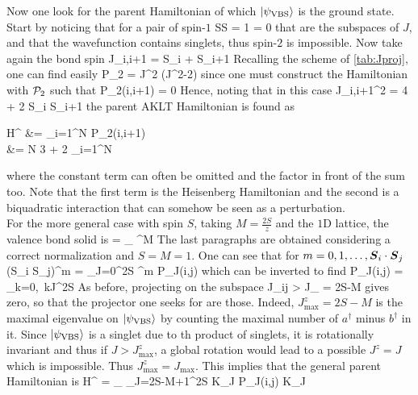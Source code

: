 		Now one look for the parent Hamiltonian of which $\ket{\psi_\text{VBS}}$ is the ground state. Start by noticing that for a pair of spin-$1$
		\be S\otimes S = 1  = 0   \ee
		that are the subspaces of $J$, and that the wavefunction contains singlets, thus spin-$2$ is impossible. Now take again the bond spin
		\be \vb* J_{i,i+1} = \vb* S_i + \vb* S_{i+1} \ee
		Recalling the scheme of \autoref{tab:Jproj}, one can find easily
		\be \mc P_2 =  \vb* J^2 (\vb* J^2-2) \ee
		since one must construct the Hamiltonian with $\mathcal P_2$ such that
		\be \mc P_2(i,i+1)  = 0 \ee
		Hence, noting that in this case
		\be \vb* J_{i,i+1}^2 = 4 + 2 \vb* S_i \cdot \vb* S_{i+1} \ee
		the parent AKLT Hamiltonian is found as
		\be \begin{split} \mc H^ &= \sum_{i=1}^N \mc P_2(i,i+1) \\ &= \frac N 3 +  2 \sum_{i=1}^N  \end{split} \ee
		where the constant term can often be omitted and the factor in front of the sum too. Note that the first term is the Heisenberg Hamiltonian and the second is a biquadratic interaction that can somehow be seen as a perturbation.\\

		For the more general case with spin $S$, taking $M=\frac{2S}{z}$ and the $1$D lattice, the valence bond solid is 
		\be {} = \prod_{} ^M  \label{eq:VBSgen} \ee
		The last paragraphs are obtained considering a correct normalization and $S=M=1$. One can see that for $m=0,1,\dotsc,\vb* S_i \cdot \vb* S_j$
		\be \left(\vb* S_i \cdot \vb* S_j\right)^m = \sum_{J=0}^{2S} ^m \mc P_J(i,j) \ee
		which can be inverted to find
		\be \mc P_J(i,j) = \prod_{k=0,\ k\neq J}^{2S} \ee
		As before, projecting on the subspace
		\be J_{ij} > J_ = 2S-M \ee
		gives zero, so that the projector one seeks for are those. Indeed, $J^z_\text{max} = 2S-M$ is the maximal eigenvalue on $\ket{\psi_\text{VBS}}$ by counting the maximal number of $a^\dagger$ minus $b^\dagger$ in it. Since $\ket{\psi_\text{VBS}}$ is a singlet due to th product of singlets, it is rotationally invariant and thus if $J>J^z_\text{max}$, a global rotation would lead to a possible $J^z = J$ which is impossible. Thus $J^z_\text{max} = J_\text{max}$. This implies that the general parent Hamiltonian is 
		\be \mc H^ = \sum_{} \sum_{J=2S-M+1}^{2S} K_J \mc P_J(i,j)  K_J  \ee

